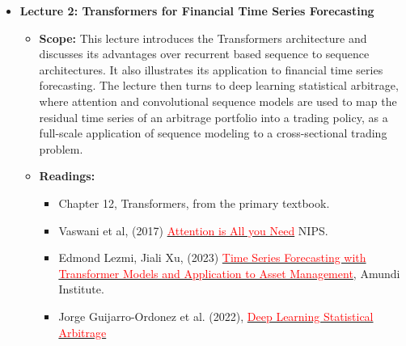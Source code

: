 \documentclass[11pt]{article}
\begin{document}
\begin{itemize}
\begin{itemize}
\begin{itemize}
        \item Oualid Missaoui (2025), \href{https://papers.ssrn.com/sol3/papers.cfm?abstract_id=5529459}{\textcolor{red}{Inductive Triplet Fine Tuning for Small Language Models}}
        \item Bryan Kelly et al. (2023) \href{https://economics.yale.edu/sites/default/files/2024-01/The\%20Journal\%20of\%20Finance\%20-\%202023\%20-\%20KELLY\%20-\%20The\%20Virtue\%20of\%20Complexity\%20in\%20Return\%20Prediction\%20\%281\%29.pdf}{\textcolor{red}{The Virtue of Complexity in Return Prediction}}
        \item Bryan Kelly et al. (2025) \href{https://papers.ssrn.com/sol3/papers.cfm?abstract_id=5346842}{\textcolor{red}{Understanding The Virtue of Complexity}}
        \item Bryan Kelly et al. (2024) \href{https://arxiv.org/pdf/2402.06635}{\textcolor{red}{Large (and Deep) Factor Models}}
      \end{itemize}
  \end{itemize}

\item \textbf{Lecture 2: Transformers for Financial Time Series Forecasting}
  \begin{itemize}
    \item \textbf{Scope:} This lecture introduces the Transformers architecture and
      discusses its advantages over recurrent based sequence to sequence
      architectures. It also illustrates its application to financial time series
      forecasting. The lecture then turns to deep learning statistical arbitrage,
      where attention and convolutional sequence models are used to map the residual
      time series of an arbitrage portfolio into a trading policy, as a full-scale
      application of sequence modeling to a cross-sectional trading problem.
    \item \textbf{Readings:}
      \begin{itemize}
        \item Chapter 12, Transformers, from the primary textbook.
        \item Vaswani et al, (2017) \href{https://arxiv.org/pdf/1706.03762}{\textcolor{red}{Attention is All you Need}} NIPS.
        \item Edmond Lezmi, Jiali Xu, (2023) \href{https://papers.ssrn.com/sol3/papers.cfm?abstract_id=4375798}{\textcolor{red}{Time Series Forecasting with Transformer Models and Application to Asset Management}}, Amundi Institute.
        \item Jorge Guijarro-Ordonez et al. (2022), \href{https://arxiv.org/pdf/2106.04028}{\textcolor{red}{Deep Learning Statistical Arbitrage}}
      \end{itemize}
  \end{itemize}


\end{itemize}
\end{document}
